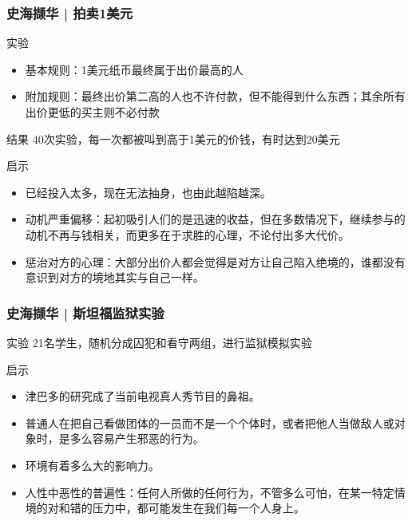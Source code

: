 \begin{frame}
  \frametitle{史海撷华 | 拍卖1美元}
  \begin{block}{实验}
    \begin{itemize}
      \item 基本规则：1美元纸币最终属于出价最高的人
      \item 附加规则：最终出价第二高的人也不许付款，但不能得到什么东西；其余所有出价更低的买主则不必付款
    \end{itemize}
  \end{block}
  \pause
  \begin{block}{结果}
    40次实验，每一次都被叫到高于1美元的价钱，有时达到20美元
  \end{block}
  \pause
  \begin{block}{启示}
    \begin{itemize}
      \item 已经投入太多，现在无法抽身，也由此越陷越深。
      \item 动机严重偏移：起初吸引人们的是迅速的收益，但在多数情况下，继续参与的动机不再与钱相关，而更多在于求胜的心理，不论付出多大代价。
      \item 惩治对方的心理：大部分出价人都会觉得是对方让自己陷入绝境的，谁都没有意识到对方的境地其实与自己一样。
    \end{itemize}
  \end{block}
\end{frame}

\begin{frame}
  \frametitle{史海撷华 | 斯坦福监狱实验}
  \begin{block}{实验}
    21名学生，随机分成囚犯和看守两组，进行监狱模拟实验
  \end{block}
  \pause
  \begin{block}{启示}
    \begin{itemize}
      \item 津巴多的研究成了当前电视真人秀节目的鼻祖。
      \item 普通人在把自己看做团体的一员而不是一个个体时，或者把他人当做敌人或对象时，是多么容易产生邪恶的行为。
      \item 环境有着多么大的影响力。
      \item 人性中恶性的普遍性：任何人所做的任何行为，不管多么可怕，在某一特定情境的对和错的压力中，都可能发生在我们每一个人身上。
    \end{itemize}
  \end{block}
\end{frame}

